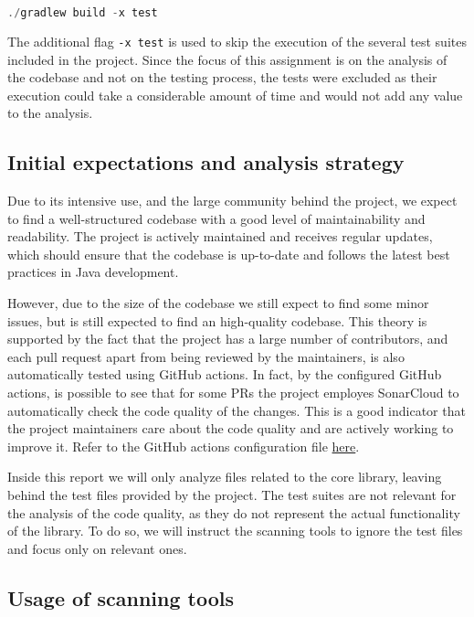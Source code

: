 \begin{lstlisting}[language=C++, caption=Building the project]
                          ./gradlew build -x test
\end{lstlisting}

The additional flag \texttt{-x test} is used to skip the execution of the several test suites included in the project. Since the focus of this assignment is on the analysis of the codebase and not on the testing process, the tests were excluded as their execution could take a considerable amount of time and would not add any value to the analysis.

\subsection{Initial expectations and analysis strategy}

Due to its intensive use, and the large community behind the project, we expect to find a well-structured codebase with a good level of maintainability and readability. The project is actively maintained and receives regular updates, which should ensure that the codebase is up-to-date and follows the latest best practices in Java development. 

However, due to the size of the codebase we still expect to find some minor issues, but is still expected to find an high-quality codebase. This theory is supported by the fact that the project has a large number of contributors, and each pull request apart from being reviewed by the maintainers, is also automatically tested using GitHub actions. In fact, by the configured GitHub actions, is possible to see that for some PRs the project employes SonarCloud to automatically check the code quality of the changes. This is a good indicator that the project maintainers care about the code quality and are actively working to improve it. Refer to the GitHub actions configuration file \href{https://github.com/resilience4j/resilience4j/blob/master/.github/workflows/gradle-build.yml#L54}{here}.

Inside this report we will only analyze files related to the core library, leaving behind the test files provided by the project. The test suites are not relevant for the analysis of the code quality, as they do not represent the actual functionality of the library. To do so, we will instruct the scanning tools to ignore the test files and focus only on relevant ones.

\subsection{Usage of scanning tools}

